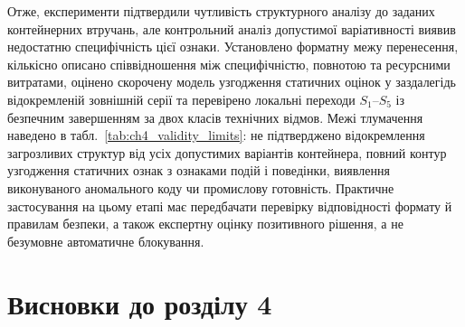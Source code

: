 Отже, експерименти підтвердили чутливість структурного аналізу до заданих контейнерних втручань, але контрольний аналіз допустимої варіативності виявив недостатню специфічність цієї ознаки. Установлено форматну межу перенесення, кількісно описано співвідношення між специфічністю, повнотою та ресурсними витратами, оцінено скорочену модель узгодження статичних оцінок у заздалегідь відокремленій зовнішній серії та перевірено локальні переходи $S_1$--$S_5$ із безпечним завершенням за двох класів технічних відмов. Межі тлумачення наведено в табл.~\ref{tab:ch4_validity_limits}: не підтверджено відокремлення загрозливих структур від усіх допустимих варіантів контейнера, повний контур узгодження статичних ознак з ознаками подій і поведінки, виявлення виконуваного аномального коду чи промислову готовність. Практичне застосування на цьому етапі має передбачати перевірку відповідності формату й правилам безпеки, а також експертну оцінку позитивного рішення, а не безумовне автоматичне блокування.

\section*{Висновки до розділу 4}
{}

